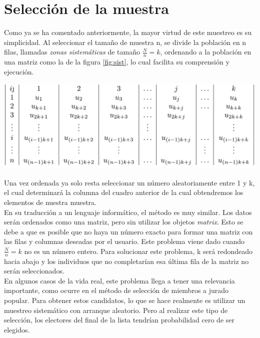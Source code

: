 \section{Selección de la muestra} \label{sect:5.1}
Como ya se ha comentado anteriormente, la mayor virtud de este muestreo es su simplicidad. Al seleccionar el tamaño de muestra n, se divide la población en n filas, llamadas \textit{zonas sistemáticas} de tamaño $\frac{N}{n} = k$, ordenando a la población en una matriz como la de la figura \ref{fig:sist}, lo cual facilita su comprensión y ejecución.\\

\begin{center}
    \includegraphics[scale=0.5]{img/sist.png}
    \label{fig:sist}
\end{center}

Una vez ordenada ya solo resta seleccionar un número aleatoriamente  entre 1 y k, el cual determinará la columna del cuadro anterior de la cual obtendremos los elementos de nuestra muestra.\\

En su traducción a un lenguaje informático, el método es muy similar. Los datos serán ordenados como una matriz, pero sin utilizar los objetos \textit{matrix}. Esto se debe a que es posible que no haya un número exacto para formar una matriz con las filas y columnas deseadas por el usuario. Este problema viene dado cuando $\frac{N}{n} = k$ no es un número entero. Para solucionar este problema, k será redondeado hacia abajo y los individuos que no completarían esa última fila de la matriz no serán seleccionados. \\

En algunos casos de la vida real, este problema llega a tener una relevancia importante, como ocurre en el método de selección de miembros a jurado popular. Para obtener estos candidatos, lo que se hace realmente es utilizar un muestreo sistemático con arranque aleatorio. Pero al realizar este tipo de selección, los electores del final de la lista tendrían probabilidad cero de ser elegidos. \\

